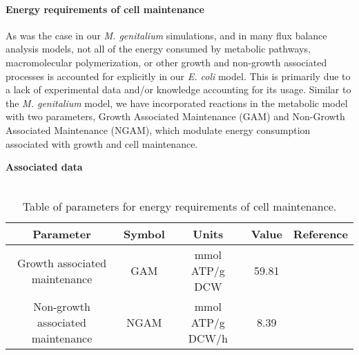 \documentclass[12pt]{article}
\begin{document}
\baselineskip24pt

\paragraph{Energy requirements of cell maintenance}
As was the case in our \textit{M. genitalium} simulations, and in many flux balance analysis models, not all of the energy consumed by metabolic pathways, macromolecular polymerization, or other growth and non-growth associated processes is accounted for explicitly in our \emph{E. coli} model. This is primarily due to a lack of experimental data and/or knowledge accounting for its usage.  Similar to the \textit{M. genitalium} model, we have incorporated reactions in the metabolic model with two parameters, Growth Associated Maintenance (GAM) and Non-Growth Associated Maintenance (NGAM), which modulate energy consumption associated with growth and cell maintenance.


\begin{table}[h!]
\hspace{12pt} \textbf{Associated data} \\\\
 \begin{tabular}{c c c c c}
 \hline
 Parameter & Symbol & Units & Value & Reference \\
 \hline
Growth associated maintenance & GAM & mmol ATP/g DCW & 59.81 & \cite{feist2007genome} \\
Non-growth associated maintenance & NGAM & mmol ATP/g DCW/h & 8.39 & \cite{feist2007genome} \\
 \hline
\end{tabular}
\caption[Table of parameters for energy requirements of cell maintenance]{Table of parameters for energy requirements of cell maintenance.}
\end{table}

\newpage

\label{sec:references}


\end{document}

